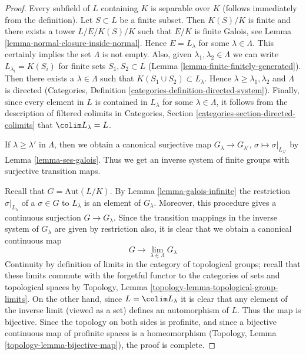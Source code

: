 \begin{proof}
Every subfield of $L$ containing $K$ is separable over $K$
(follows immediately from the definition). Let $S \subset L$
be a finite subset. Then $K(S)/K$ is finite and there exists
a tower $L/E/K(S)/K$ such that $E/K$ is finite Galois, see
Lemma \ref{lemma-normal-closure-inside-normal}.
Hence $E = L_\lambda$ for some $\lambda \in \Lambda$.
This certainly implies the set $\Lambda$ is not empty.
Also, given $\lambda_1, \lambda_2 \in \Lambda$ we can
write $L_{\lambda_i} = K(S_i)$ for finite sets
$S_1, S_2 \subset L$ (Lemma \ref{lemma-finite-finitely-generated}).
Then there exists a $\lambda \in \Lambda$ such that
$K(S_1 \cup S_2) \subset L_\lambda$. Hence
$\lambda \geq \lambda_1, \lambda_2$ and
$\Lambda$ is directed (Categories, Definition
\ref{categories-definition-directed-system}).
Finally, since every element in $L$ is contained in
$L_\lambda$ for some $\lambda \in \Lambda$, it follows
from the description of filtered colimits in
Categories, Section \ref{categories-section-directed-colimits}
that $\colim L_\lambda = L$.

\medskip\noindent
If $\lambda \geq \lambda'$ in $\Lambda$, then we obtain a
canonical surjective map $G_\lambda \to G_{\lambda'}$,
$\sigma \mapsto \sigma|_{L_{\lambda'}}$
by Lemma \ref{lemma-ses-galois}. Thus we get an inverse
system of finite groups with surjective transition maps.

\medskip\noindent
Recall that $G = \text{Aut}(L/K)$. By Lemma \ref{lemma-galois-infinite}
the restriction $\sigma|_{L_\lambda}$ of a $\sigma \in G$ to $L_\lambda$
is an element of $G_\lambda$. Moreover, this procedure gives a continuous
surjection $G \to G_\lambda$. Since the transition mappings
in the inverse system of $G_\lambda$ are given by restriction
also, it is clear that we obtain a canonical continuous map
$$
G \longrightarrow \lim_{\lambda \in \Lambda} G_\lambda
$$
Continuity by definition of limits in the category of topological
groups; recall that these limits commute with the forgetful functor
to the categories of sets and topological spaces by
Topology, Lemma \ref{topology-lemma-topological-group-limits}.
On the other hand, since $L = \colim L_\lambda$ it is clear
that any element of the inverse limit (viewed as a set) defines an
automorphism of $L$. Thus the map is bijective. Since the topology
on both sides is profinite, and since a bijective continuous map
of profinite spaces is a homeomorphism
(Topology, Lemma \ref{topology-lemma-bijective-map}), the proof is complete.
\end{proof}

